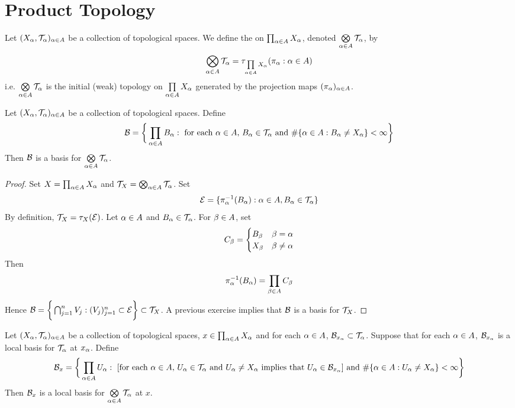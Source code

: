 \documentclass{book}
\begin{document}
	
	
	
	
	
	
	
	
	
	
	
	
	
	\newpage
	\section{Product Topology}
	
	\begin{defn}
	Let $(X_{\alpha}, \mathcal{T}_{\alpha})_{\alpha \in A}$ be a collection of topological spaces. We define the  on $\prod_{\alpha \in A}X_{\alpha}$, denoted $\bigotimes\limits_{\alpha \in A} \mathcal{T}_{\alpha}$, by 
	$$\bigotimes\limits_{\alpha \in A} \mathcal{T}_{\alpha} = \tau_{\prod\limits_{\alpha \in A} X_{\alpha}}(\pi_{\alpha}: {\alpha \in A})$$
	i.e. $\bigotimes\limits_{\alpha \in A} \mathcal{T}_{\alpha} $ is the initial (weak) topology on $\prod\limits_{\alpha \in A} X_{\alpha}$ generated by the projection maps $(\pi_{\alpha})_{\alpha \in A}$.
	\end{defn}

	\begin{ex}
		Let $(X_{\alpha}, \mathcal{T}_{\alpha})_{\alpha \in A}$ be a collection of topological spaces. Define 
		$$\mathcal{B} = \bigg \{\prod_{\alpha \in A}B_{\alpha}: \text{ for each $\alpha \in A$,  $B_{\alpha} \in \mathcal{T}_{\alpha}$ and $\# \{\alpha \in A: B_{\alpha} \neq X_{\alpha}\} < \infty$} \bigg\}$$
		Then $\mathcal{B}$ is a basis for $\bigotimes\limits_{\alpha \in A} \mathcal{T}_{\alpha}$.
	\end{ex}

	\begin{proof}
		Set $X = \prod_{\alpha \in A}X_{\alpha}$ and $\mathcal{T}_X = \bigotimes_{\alpha \in A} \mathcal{T}_{\alpha}$. Set 
		$$\mathcal{E} = \{\pi_{\alpha}^{-1}(B_{\alpha}): \alpha \in A, B_{\alpha} \in \mathcal{T}_{\alpha}\}$$ 
		By definition, $\mathcal{T}_{X} = \tau_{X}(\mathcal{E})$. Let $\alpha \in A$ and $B_{\alpha} \in \mathcal{T}_{\alpha}$. For $\beta \in A$, set 
		\[
		C_{\beta} = 
		\begin{cases}
			B_{\beta} & \beta = \alpha \\
			X_{\beta} & \beta \neq \alpha
		\end{cases}
		\]
		Then 
		\begin{align*}
			\pi_{\alpha}^{-1}(B_{\alpha}) = \prod_{\beta \in A} C_{\beta}  
		\end{align*}
		Hence $\mathcal{B} = \bigg \{\bigcap_{j=1}^n V_j:(V_j)_{j=1}^n \subset \mathcal{E} \bigg \} \subset \mathcal{T}_X$. A previous exercise implies that $\mathcal{B}$ is a basis for $\mathcal{T}_X$.
	\end{proof}

	\begin{ex}
		Let $(X_{\alpha}, \mathcal{T}_{\alpha})_{\alpha \in A}$ be a collection of topological spaces, $x \in \prod_{\alpha \in A}X_{\alpha}$ and for each $\alpha \in A$, $\mathcal{B}_{x_{\alpha}} \subset \mathcal{T}_{\alpha}$. Suppose that for each $\alpha \in A$, $\mathcal{B}_{x_{\alpha}}$ is a local basis for $\mathcal{T}_{\alpha}$ at $x_{\alpha}$. Define 
		$$\mathcal{B}_x = \bigg \{\prod_{\alpha \in A} U_{\alpha}: \text{ [for each $\alpha \in A$, $U_{\alpha} \in \mathcal{T}_{\alpha}$ and $U_{\alpha} \neq X_{\alpha}$ implies that $U_{\alpha} \in \mathcal{B}_{x_{\alpha}}$] and $\# \{\alpha \in A: U_{\alpha} \neq X_{\alpha}\} < \infty$} \bigg\}$$
		Then $\mathcal{B}_x$ is a local basis for $\bigotimes\limits_{\alpha \in A} \mathcal{T}_{\alpha}$ at $x$.
	\end{ex}
\end{document}
